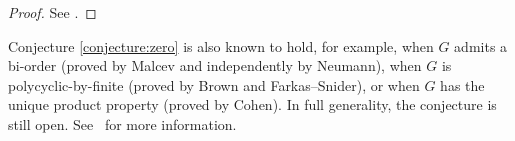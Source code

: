 \begin{proof}
    See \cite[Theorem 13.3.9]{MR798076}.
\end{proof}

Conjecture \ref{conjecture:zero} is also known to hold, for example, when $G$ admits a bi-order (proved by Malcev and independently by Neumann), when $G$ is polycyclic-by-finite (proved by Brown and Farkas--Snider), or when $G$ has the unique product property (proved by Cohen).  In full generality, the conjecture is still open. See~\cite[Chapter 13]{MR798076} for more information. 


